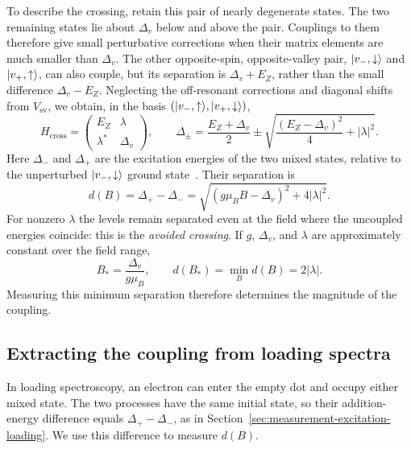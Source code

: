 To describe the crossing, retain this pair of nearly degenerate
states. The two remaining states lie about $\Delta_v$ below
and above the pair. Couplings to them therefore give small
perturbative corrections when their matrix elements are much
smaller than $\Delta_v$. The other opposite-spin,
opposite-valley pair, $\lvert v_-,\downarrow\rangle$ and
$\lvert v_+,\uparrow\rangle$, can also couple, but its separation is
$\Delta_v+E_Z$, rather than the small difference
$\Delta_v-E_Z$. Neglecting the off-resonant corrections and
diagonal shifts from $V_{\mathrm{sv}}$, we obtain, in the basis
$(\lvert v_-,\uparrow\rangle,\lvert v_+,\downarrow\rangle)$,
\begin{equation}
 H_{\mathrm{cross}}=
 \begin{pmatrix}E_Z&\lambda\\\lambda^*&\Delta_v\end{pmatrix},
 \qquad
 \Delta_\pm=\frac{E_Z+\Delta_v}{2}
       \pm\sqrt{\frac{(E_Z-\Delta_v)^2}{4}+|\lambda|^2}.
 \label{eq:measurement-spin-valley-anticrossing}
\end{equation}
Here $\Delta_-$ and $\Delta_+$ are the excitation energies
of the two mixed states, relative to the unperturbed
$\lvert v_-,\downarrow\rangle$ ground state~\cite{Yang2013SpinValley}.
Their separation is
\begin{equation}
 d(B)=\Delta_+-\Delta_-
     =\sqrt{(g\mu_BB-\Delta_v)^2+4|\lambda|^2}.
 \label{eq:measurement-spin-valley-separation}
\end{equation}
For nonzero $\lambda$ the levels remain separated even at the
field where the uncoupled energies coincide: this is the
\emph{avoided crossing}. If $g$, $\Delta_v$, and $\lambda$
are approximately constant over the field range,
\begin{equation}
 B_*=\frac{\Delta_v}{g\mu_B},
 \qquad d(B_*)=\min_B d(B)=2|\lambda|.
 \label{eq:measurement-spin-valley-minimum-gap}
\end{equation}
Measuring this minimum separation therefore determines
the magnitude of the coupling.

\subsection{Extracting the coupling from loading spectra}
In loading spectroscopy, an electron can enter the empty dot
and occupy either mixed state. The two processes have the same
initial state, so their addition-energy difference equals
$\Delta_+-\Delta_-$, as in
Section~\ref{sec:measurement-excitation-loading}. We use this
difference to measure $d(B)$.

